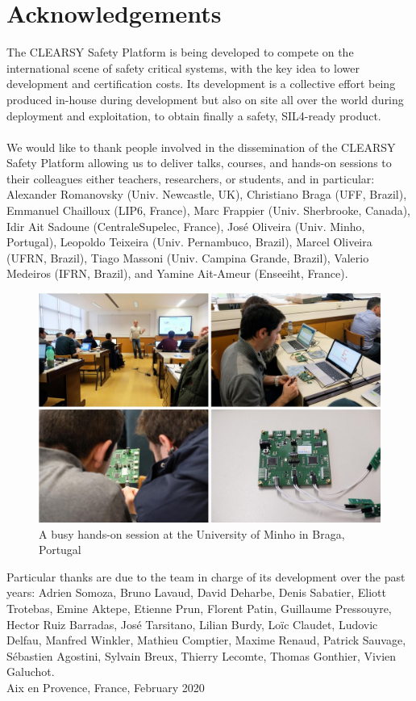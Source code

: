 \section{Acknowledgements}
The CLEARSY Safety Platform is being developed to compete on the international scene of safety critical systems, with the key idea to lower development and certification costs. Its development is a collective effort being produced in-house during development but also on site all over the world during deployment and exploitation, to obtain finally a safety, SIL4-ready product.\\
\\
We would like to thank people involved in the dissemination of the CLEARSY Safety Platform allowing us to deliver talks, courses, and hands-on sessions to their colleagues either teachers, researchers, or students, and in particular: Alexander Romanovsky (Univ. Newcastle, UK), Christiano Braga (UFF, Brazil), Emmanuel Chailloux (LIP6, France), Marc Frappier (Univ. Sherbrooke, Canada), Idir Ait Sadoune (CentraleSupelec, France), José Oliveira (Univ. Minho, Portugal), Leopoldo Teixeira (Univ. Pernambuco, Brazil), Marcel Oliveira (UFRN, Brazil), Tiago Massoni (Univ. Campina Grande, Brazil), Valerio Medeiros (IFRN, Brazil), and Yamine Ait-Ameur (Enseeiht, France). \\

\begin{figure}[h]
\centering\includegraphics[scale=0.3]{Pictures/FOREWORD-TALK.jpg}
\caption{A busy hands-on session at the University of Minho in Braga, Portugal}
\end{figure}


Particular thanks are due to the team in charge of its development over the past years: Adrien Somoza, Bruno Lavaud, David Deharbe, Denis Sabatier, Eliott Trotebas, Emine Aktepe, Etienne Prun, Florent Patin, Guillaume Pressouyre, Hector Ruiz Barradas, José Tarsitano, Lilian Burdy, Loïc Claudet, Ludovic Delfau, Manfred Winkler, Mathieu Comptier, Maxime Renaud, Patrick Sauvage, Sébastien Agostini, Sylvain Breux, Thierry Lecomte, Thomas Gonthier, Vivien Galuchot.\\

%
\hspace*{\fill} Aix en Provence, France, February 2020
